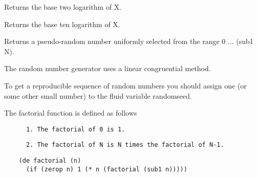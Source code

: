 {    Returns the base two logarithm of X.  }

{    Returns the base ten logarithm of X.  }

{    Returns  a  pseudo-random number uniformly selected from the
    range 0 ... (sub1 N).  }

The random number generator uses a linear congruential method.    

{
To  get a reproducible sequence of random numbers
    you should assign one (or some other small  number)  to  the
    fluid variable randomseed.  }

{    The factorial function is defined as follows
}
\begin{verbatim}
      1. The factorial of 0 is 1.
\end{verbatim}
\begin{verbatim}
      2. The factorial of N is N times the factorial of N-1.
\end{verbatim}
\begin{verbatim}
    (de factorial (n)
      (if (zerop n) 1 (* n (factorial (sub1 n)))))
\end{verbatim}
